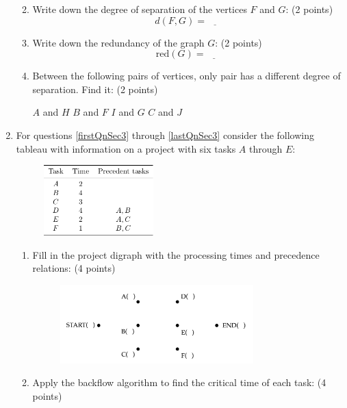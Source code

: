 \documentclass[12pt]{exam}
\begin{document}
\begin{enumerate}
\begin{enumerate}
\begin{center}
    \end{center}
    \item Write down the degree of separation of the vertices $F$ and $G$: (2 points)
    $$d(F,G)=\underline{\phantom{ans}}$$
    \item Write down the redundancy of the graph $G$: (2 points)
    $$\text{red}(G)=\underline{\phantom{ans}}$$
    \item \label{lastQnSec2} Between the following pairs of vertices, only pair has a different degree of separation. Find it: (2 points)
    \begin{checkboxes}
        \choice $A$ and $H$
        \choice $B$ and $F$
        \choice $I$ and $G$
        \choice $C$ and $J$
    \end{checkboxes}
    \vfill
\end{enumerate}
    \newpage
\item For questions \ref{firstQnSec3} through \ref{lastQnSec3} consider the following tableau with information on a project with six tasks $A$ through $E$:\par
    \begin{figure}[h]
        \centering
        \includegraphics[width=0.4\textwidth]{tableQ3.pdf}
    \end{figure}
\begin{enumerate}
    \item \label{firstQnSec3} Fill in the project digraph with the processing times and precedence relations: (4 points)
    \begin{figure}[h]
        \centering
        \includegraphics[width=0.75\textwidth]{ProjDigraph1.png}
    \end{figure}
    \vfill 
\item Apply the backflow algorithm to find the critical time of each task: (4 points)

\end{enumerate}
\end{enumerate}
\end{document}
